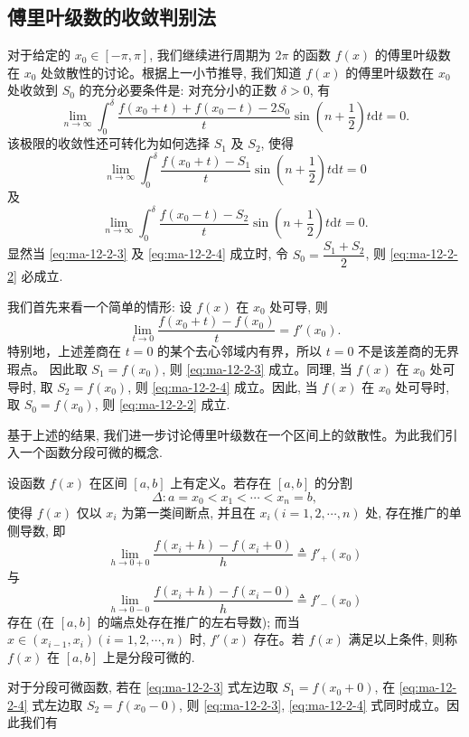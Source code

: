 \subsection{傅里叶级数的收敛判别法}
\label{subsec:ma-12-2-2}

对于给定的 $x_0\in[-\pi,\pi]$, 我们继续进行周期为 $2\pi$ 的函数 $f(x)$ 的傅里叶级数在 $x_0$ 处敛散性的讨论。根据上一小节推导, 我们知道 $f(x)$ 的傅里叶级数在 $x_0$ 处收敛到 $S_0$ 的充分必要条件是: 对充分小的正数 $\delta>0$, 有
\begin{equation}
  \lim_{n\to\infty}\int_0^\delta
  \frac{f(x_0+t)+f(x_0-t)-2S_0}{t}
  \sin\left(n+\frac12\right)t\mathrm dt=0.
  \label{eq:ma-12-2-2}
\end{equation}
该极限的收敛性还可转化为如何选择 $S_1$ 及 $S_2$, 使得
\begin{equation}
  \lim_{n\to\infty}\int_0^\delta
  \frac{f(x_0+t)-S_1}{t}\sin\left(n+\frac12\right)t\mathrm dt=0
  \label{eq:ma-12-2-3}
\end{equation}
及
\begin{equation}
  \lim_{n\to\infty}\int_0^\delta
  \frac{f(x_0-t)-S_2}{t}\sin\left(n+\frac12\right)t\mathrm dt=0.
  \label{eq:ma-12-2-4}
\end{equation}
显然当 \eqref{eq:ma-12-2-3} 及 \eqref{eq:ma-12-2-4} 成立时, 令 $S_0=\dfrac{S_1+S_2}{2}$, 则 \eqref{eq:ma-12-2-2} 必成立.

我们首先来看一个简单的情形: 设 $f(x)$ 在 $x_0$ 处可导, 则
\[
  \lim_{t\to0}\frac{f(x_0+t)-f(x_0)}{t}=f'(x_0).
\]
特别地，上述差商在 $t=0$ 的某个去心邻域内有界，所以 $t=0$ 不是该差商的无界瑕点。 因此取 $S_1=f(x_0)$, 则 \eqref{eq:ma-12-2-3} 成立。同理, 当 $f(x)$ 在 $x_0$ 处可导时, 取 $S_2=f(x_0)$, 则 \eqref{eq:ma-12-2-4} 成立。因此, 当 $f(x)$ 在 $x_0$ 处可导时, 取 $S_0=f(x_0)$, 则 \eqref{eq:ma-12-2-2} 成立.

基于上述的结果, 我们进一步讨论傅里叶级数在一个区间上的敛散性。为此我们引入一个函数分段可微的概念.

设函数 $f(x)$ 在区间 $[a,b]$ 上有定义。若存在 $[a,b]$ 的分割
\[
  \Delta: a=x_0<x_1<\cdots<x_n=b,
\]
使得 $f(x)$ 仅以 $x_i$ 为第一类间断点, 并且在 $x_i(i=1,2,\cdots,n)$ 处, 存在推广的单侧导数, 即
\[
  \lim_{h\to0+0}\frac{f(x_i+h)-f(x_i+0)}{h}\triangleq f'_+(x_0)
\]
与
\[
  \lim_{h\to0-0}\frac{f(x_i+h)-f(x_i-0)}{h}\triangleq f'_-(x_0)
\]
存在 (在 $[a,b]$ 的端点处存在推广的左右导数); 而当 $x\in(x_{i-1},x_i)(i=1,2,\cdots,n)$ 时, $f'(x)$ 存在。若 $f(x)$ 满足以上条件, 则称 $f(x)$ 在 $[a,b]$ 上是分段可微的.

对于分段可微函数, 若在 \eqref{eq:ma-12-2-3} 式左边取 $S_1=f(x_0+0)$, 在 \eqref{eq:ma-12-2-4} 式左边取 $S_2=f(x_0-0)$, 则 \eqref{eq:ma-12-2-3}, \eqref{eq:ma-12-2-4} 式同时成立。因此我们有

